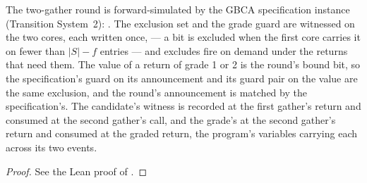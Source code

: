 \begin{theorem}
  \label{thm:gbca-round-refines-specification}
  \leanok
  The two-gather round is forward-simulated by the GBCA specification instance (Transition System~2): .
  The exclusion set and the grade guard are witnessed on the two cores, each written once, --- a bit is excluded when the first core carries it on fewer than $|S| - f$ entries --- and excludes fire on demand under the returns that need them.
  The value of a return of grade 1 or 2 is the round's bound bit, so the specification's guard on its announcement and its guard pair on the value are the same exclusion, and the round's announcement is matched by the specification's.
  The candidate's witness is recorded at the first gather's return and consumed at the second gather's call, and the grade's at the second gather's return and consumed at the graded return, the program's variables carrying each across its two events.
\end{theorem}

\begin{proof}\leanok
  See the Lean proof of .
\end{proof}
